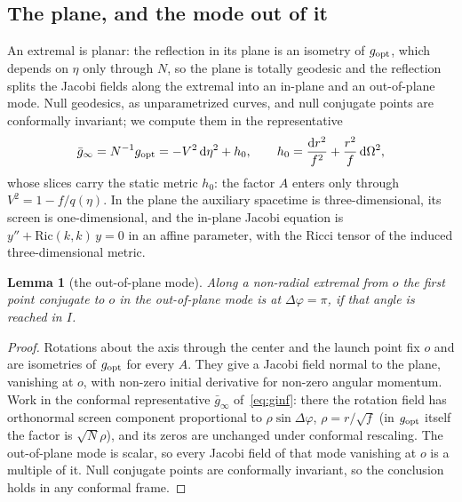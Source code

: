 \documentclass[aip,jmp,amsmath,amssymb,reprint]{revtex4-2}
\newcommand{\dd}{\mathrm{d}}
\newcommand{\gopt}{g_{\rm opt}}
\theoremstyle{plain}
\newtheorem{lemma}[proposition]{Lemma}
\theoremstyle{definition}
\begin{document}
\subsection{The plane, and the mode out of it}
\label{sec:plane}
An extremal is planar: the reflection in its plane is an isometry of $\gopt$, which
depends on $\eta$ only through $N$, so the plane is totally geodesic and the reflection
splits the Jacobi fields along the extremal into an in-plane and an out-of-plane mode.
Null geodesics, as unparametrized curves, and null conjugate points are conformally invariant;
we compute them in the representative
\begin{equation}
  \bar g_\infty=N^{-1}\gopt=-V^2\,\dd\eta^2+h_0,\qquad h_0=\frac{\dd r^2}{f^2}+\frac{r^2}{f}\,\dd\Omega^2,
  \label{eq:ginf}
\end{equation}
whose slices carry the static metric $h_0$: the factor $A$ enters only through $V^2=1-f/q(\eta)$.
In the plane the auxiliary spacetime is three-dimensional, its screen is one-dimensional, and
the in-plane Jacobi equation is $y''+\mathrm{Ric}(k,k)\,y=0$ in an affine parameter, with the Ricci
tensor of the induced three-dimensional metric.

\begin{lemma}[the out-of-plane mode]\label{lem:outofplane}
Along a non-radial extremal from $o$ the first point conjugate to $o$ in the
out-of-plane mode is at $\Delta\varphi=\pi$, if that angle is reached in $I$.
\end{lemma}

\begin{proof}
Rotations about the axis through the center and the launch point fix $o$ and are
isometries of $\gopt$ for every $A$. They give a Jacobi field normal to the plane,
vanishing at $o$, with non-zero initial derivative for non-zero angular momentum. Work in the
conformal representative $\bar g_\infty$ of~\eqref{eq:ginf}: there the rotation field has orthonormal screen component proportional
to $\rho\sin\Delta\varphi$, $\rho=r/\sqrt f$ (in $\gopt$ itself the factor is $\sqrt N\rho$), and its zeros
are unchanged under conformal rescaling. The out-of-plane mode is
scalar, so every Jacobi field of that mode vanishing at $o$ is a multiple of it. Null
conjugate points are conformally invariant, so the conclusion holds in any conformal
frame.
\end{proof}
\end{document}
